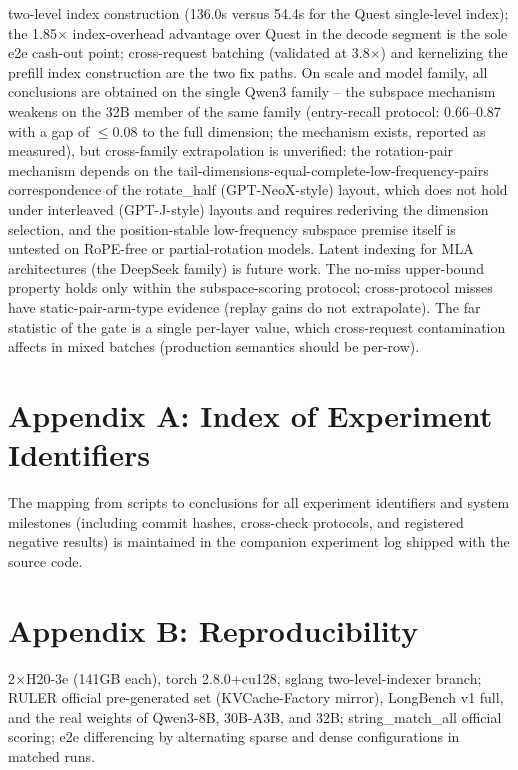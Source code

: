 \documentclass[11pt]{article}
\begin{document}
two-level index construction (136.0s versus 54.4s for the Quest single-level index); the 1.85$\times$ index-overhead advantage over Quest in the decode segment is the sole e2e cash-out point; cross-request batching (validated at 3.8$\times$) and kernelizing the prefill index construction are the two fix paths. On scale and model family, all conclusions are obtained on the single Qwen3 family -- the subspace mechanism weakens on the 32B member of the same family (entry-recall protocol: 0.66--0.87 with a gap of $\le$0.08 to the full dimension; the mechanism exists, reported as measured), but cross-family extrapolation is unverified: the rotation-pair mechanism depends on the tail-dimensions-equal-complete-low-frequency-pairs correspondence of the rotate\_half (GPT-NeoX-style) layout, which does not hold under interleaved (GPT-J-style) layouts and requires rederiving the dimension selection, and the position-stable low-frequency subspace premise itself is untested on RoPE-free or partial-rotation models. Latent indexing for MLA architectures (the DeepSeek family) is future work. The no-miss upper-bound property holds only within the subspace-scoring protocol; cross-protocol misses have static-pair-arm-type evidence (replay gains do not extrapolate). The far statistic of the gate is a single per-layer value, which cross-request contamination affects in mixed batches (production semantics should be per-row).

\section*{Appendix A: Index of Experiment Identifiers}
The mapping from scripts to conclusions for all experiment identifiers and system milestones (including commit hashes, cross-check protocols, and registered negative results) is maintained in the companion experiment log shipped with the source code.

\section*{Appendix B: Reproducibility}
2$\times$H20-3e (141GB each), torch 2.8.0+cu128, sglang two-level-indexer branch; RULER official pre-generated set (KVCache-Factory mirror), LongBench v1 full, and the real weights of Qwen3-8B, 30B-A3B, and 32B; string\_match\_all official scoring; e2e differencing by alternating sparse and dense configurations in matched runs.
\end{document}
